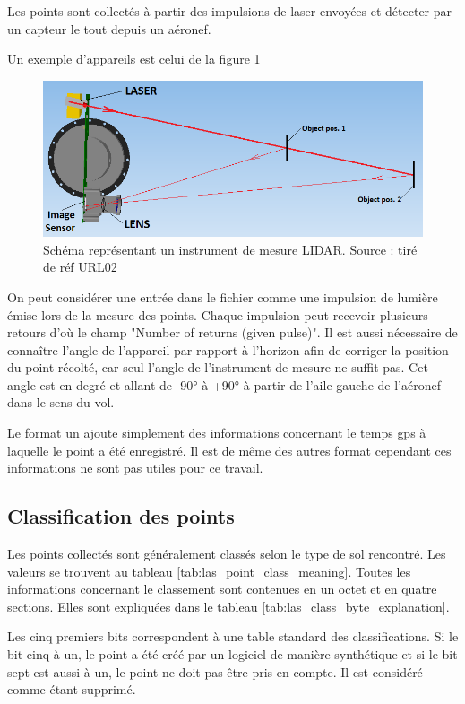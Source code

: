 Les points sont collectés à partir des impulsions de laser envoyées et détecter par un capteur le tout depuis un aéronef.

Un exemple d'appareils est celui de la figure \ref{fig:lidar_scheme}

\begin{figure}[htbp!]
    \centering
    \includegraphics[width=0.8\linewidth]{figures/lidar_schema.png}
    \caption{Schéma représentant un instrument de mesure LIDAR. Source : tiré de réf URL02}
    \label{fig:lidar_scheme}
\end{figure}

On peut considérer une entrée dans le fichier comme une impulsion de lumière émise lors de la mesure des points.
Chaque impulsion peut recevoir plusieurs retours d'où le champ "Number of returns (given pulse)".
Il est aussi nécessaire de connaître l'angle de l'appareil par rapport à l'horizon afin de corriger la position du point récolté, car seul l'angle de l'instrument de mesure ne suffit pas.
Cet angle est en degré et allant de -90° à +90° à partir de l'aile gauche de l'aéronef dans le sens du vol.

Le format un ajoute simplement des informations concernant le temps \gls{gps} à laquelle le point a été enregistré.
Il est de même des autres format cependant ces informations ne sont pas utiles pour ce travail.

\subsection{Classification des points}

Les points collectés sont généralement classés selon le type de sol rencontré. Les valeurs se trouvent au tableau \ref{tab:las_point_class_meaning}.
Toutes les informations concernant le classement sont contenues en un octet et  en quatre sections. Elles sont expliquées dans le tableau \ref{tab:las_class_byte_explanation}.

Les cinq premiers bits correspondent à une table standard des classifications.
Si le bit cinq à un, le point a été créé par un logiciel de manière synthétique et si le bit sept est aussi à un, le point ne doit pas être pris en compte. Il est considéré comme étant supprimé.

